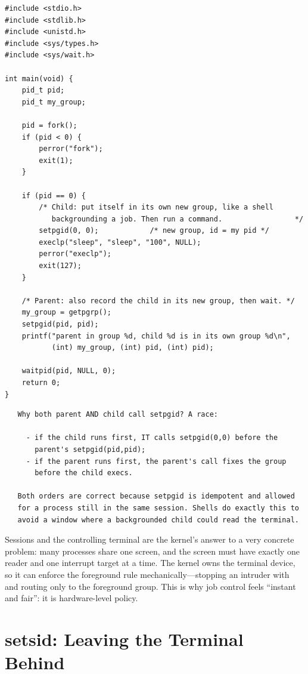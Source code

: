 \begin{lstlisting}[caption={Forking a background job is group arithmetic.}]
#include <stdio.h>
#include <stdlib.h>
#include <unistd.h>
#include <sys/types.h>
#include <sys/wait.h>

int main(void) {
    pid_t pid;
    pid_t my_group;

    pid = fork();
    if (pid < 0) {
        perror("fork");
        exit(1);
    }

    if (pid == 0) {
        /* Child: put itself in its own new group, like a shell
           backgrounding a job. Then run a command.                 */
        setpgid(0, 0);            /* new group, id = my pid */
        execlp("sleep", "sleep", "100", NULL);
        perror("execlp");
        exit(127);
    }

    /* Parent: also record the child in its new group, then wait. */
    my_group = getpgrp();
    setpgid(pid, pid);
    printf("parent in group %d, child %d is in its own group %d\n",
           (int) my_group, (int) pid, (int) pid);

    waitpid(pid, NULL, 0);
    return 0;
}
\end{lstlisting}

\begin{verbatim}
   Why both parent AND child call setpgid? A race:

     - if the child runs first, IT calls setpgid(0,0) before the
       parent's setpgid(pid,pid);
     - if the parent runs first, the parent's call fixes the group
       before the child execs.

   Both orders are correct because setpgid is idempotent and allowed
   for a process still in the same session. Shells do exactly this to
   avoid a window where a backgrounded child could read the terminal.
\end{verbatim}

\begin{osconcept}
Sessions and the controlling terminal are the kernel's answer to a
very concrete problem: many processes share one screen, and the screen
must have exactly one reader and one interrupt target at a time. The
kernel owns the terminal device, so it can enforce the foreground rule
mechanically---stopping an intruder with  and routing
 only to the foreground group. This is why job control
feels ``instant and fair'': it is hardware-level policy.
\end{osconcept}

\section{setsid: Leaving the Terminal Behind}

